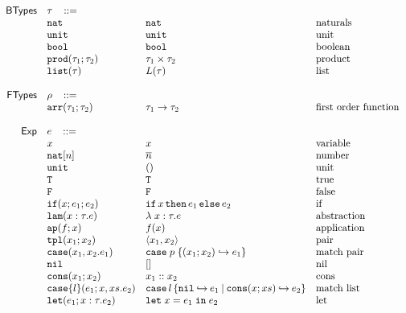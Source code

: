 \documentclass[11pt]{article}
\newcommand{\ms}[1]{\ensuremath{\mathsf{#1}}}
\newcommand{\irl}[1]{\mathtt{#1}}
\newcommand{\paircaseabt}[4]{\irl{case}(#2,#3.#4)}
\newcommand{\paircasecst}[4]{\irl{case} \; #1\; \{(#2;#3) \hookrightarrow #4\}}
\theoremstyle{definition}
\begin{document}
\[
\begin{array}{r l l l l}
\ms{BTypes} & \tau \,\,\,\,\, ::= \\
	& \irl{nat}                	 			& \irl{nat}											& \text{naturals}\\
	& \unittyabt                	 			& \unittycst										& \text{unit}\\
  & \booltyabt                       & \booltycst                    & \text{boolean}\\
  & \prodtyabt{\tau_1}{\tau_2}       & \prodtycst{\tau_1}{\tau_2}    & \text{product}\\
  &\listtyabt{\tau}		& L(\tau)											& \text{list}\\
  \\
\ms{FTypes} & \rho \,\,\,\,\, ::= \\
	&\irl{arr}(\tau_1;\tau_2) 				& \arrtycst{\tau_1}{\tau_2} 									& \text{first order function}\\
	 \\
\ms{Exp}
        & e   \,\,\,\,\, ::= \\
 	& x                                			& x 												& \text{variable}\\
  & \irl{nat}[n]							& \numeral{n}												& \text{number}\\
  & \irl{unit}							& ()												& \text{unit}\\
  & \irl{T}							& \irl{T}												& \text{true}\\
  & \irl{F}	   					& \irl{F}												& \text{false}\\
  & \ifexabt{x}{e_1}{e_2} & \ifexcst{x}{e_1}{e_2}  & \text{if}\\
  & \irl{lam}(x:\tau.e) 						&\lambda \; x : \tau. e 		& \text{abstraction}\\
  & \irl{ap}(f;x) 					& \appcst{f}{x} 										& \text{application}\\
  & \irl{tpl}(x_1;x_2)     	& \pairexcst{x_1}{x_2}                									& \text{pair}\\
 	& \paircaseabt{p}{x_1}{x_2}{e_1}					& \paircasecst{p}{x_1}{x_2}{e_1}   	& \text{match pair}\\
 	& \nilexabt					& []   										& \text{nil}\\
 	& \consexabt{x_1}{x_2}					& x_1::x_2   										& \text{cons}\\
 	& \listcaseexabt{l}{e_1}{x}{xs}{e_2}					& \listcaseexcst{l}{e_1}{x}{xs}{e_2}   	& \text{match list}\\
  & \irl{let}(e_1; x : \tau.e_2)			& \irl{let}\; x = e_1 \; \irl{in}\; e_2   	& \text{let}\\

\end{array}\]
\end{document}
